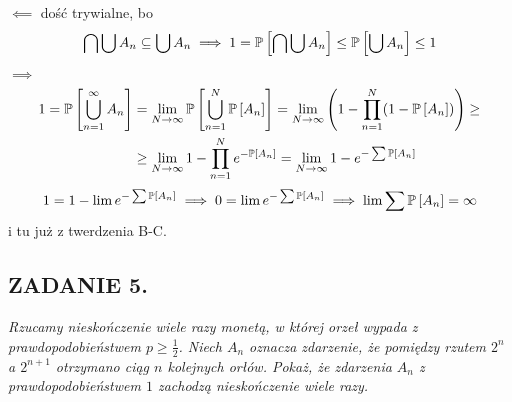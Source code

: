 \documentclass{article}
\begin{document}
$\impliedby$
dość trywialne, bo
$$\bigcap\bigcup A_n\subseteq\bigcup A_n\implies 1=\mathbb{P}\left[\bigcap\bigcup A_n\right]\leq \mathbb{P}\left[\bigcup A_n\right]\leq1$$

$\implies$
\begin{align*}
    1=\mathbb{P}\left[\bigcup\limits_{n=1}^\infty A_n\right]&=\lim\limits_{N\to\infty}\mathbb{P}\left[\bigcup\limits_{n=1}^N\mathbb{P}\left[A_n\right]\right]=\lim\limits_{N\to \infty}\left(1-\prod\limits_{n=1}^N(1-\mathbb{P}\left[A_n\right])\right)\geq\\
    &\geq\lim\limits_{N\to\infty}1-\prod\limits_{n=1}^Ne^{-\mathbb{P}\left[A_n\right]}=\lim\limits_{N\to\infty}1-e^{-\sum\mathbb{P}\left[A_n\right]}
\end{align*}
$$1=1-\lim e^{-\sum\mathbb{P}\left[A_n\right]}\implies 0=\lim e^{-\sum\mathbb{P}\left[A_n\right]}\implies \lim\sum\mathbb{P}\left[A_n\right]=\infty$$
i tu już z twerdzenia B-C.


\subsection*{ZADANIE 5.}
\emph{\color{pink}Rzucamy nieskończenie wiele razy monetą, w której orzeł wypada z prawdopodobieństwem $p\geq\frac12$. Niech $A_n$ oznacza zdarzenie, że pomiędzy rzutem $2^n$ a $2^{n+1}$ otrzymano ciąg $n$ kolejnych orłów. Pokaż, że zdarzenia $A_n$ z prawdopodobieństwem $1$ zachodzą nieskończenie wiele razy.}
\smallskip

%
%
%
%
\end{document}
